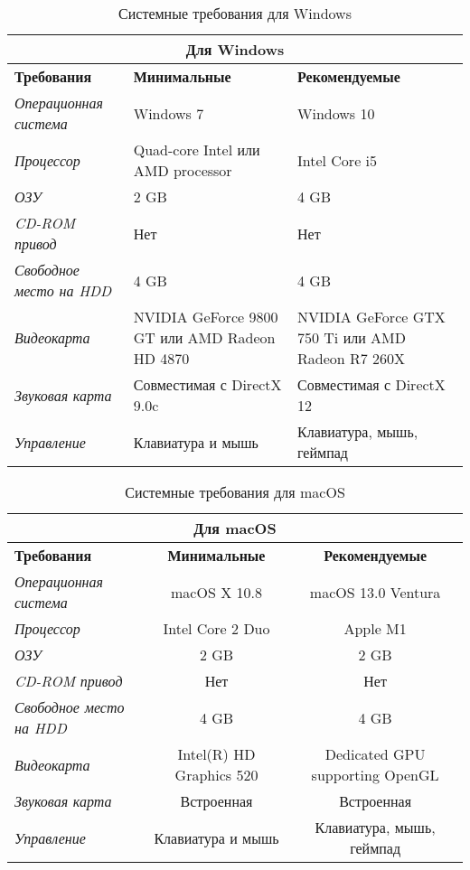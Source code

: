 \documentclass{article}
\begin{document}
	\begin{table}[h!]
		\centering
		\renewcommand{\arraystretch}{1.5}
		\setlength{\tabcolsep}{8pt}
		\begin{tabular}{|p{}|p{}|p{}|}
			\hline
			\multicolumn{3}{|c|}{\textbf{Для Windows}} \\ \hline
			\textbf{Требования} & \textbf{Минимальные} & \textbf{Рекомендуемые} \\ \hline
			\textit{Операционная система} & Windows 7 & Windows 10 \\ \hline
			\textit{Процессор} & Quad-core Intel \newline или AMD processor & Intel Core i5 \\ \hline
			\textit{ОЗУ} & 2 GB & 4 GB \\ \hline
			\textit{CD-ROM привод} & Нет & Нет \\ \hline
			\textit{Свободное место на HDD} & 4 GB & 4 GB \\ \hline
			\textit{Видеокарта} & NVIDIA GeForce 9800 GT \newline или AMD Radeon HD 4870 & NVIDIA GeForce GTX 750 Ti \newline или AMD Radeon R7 260X \\ \hline
			\textit{Звуковая карта} & Совместимая с DirectX 9.0c & Совместимая с DirectX 12 \\ \hline
			\textit{Управление} & Клавиатура и мышь & Клавиатура, мышь, геймпад \\ \hline
		\end{tabular}
		\caption{Системные требования для Windows}
		\label{tab:system-requirements1}
	\end{table}
	
	\begin{table}[h!]
		\centering
		\renewcommand{\arraystretch}{1.5}
		\setlength{\tabcolsep}{8pt}
		\begin{tabular}{|l|c|c|}
			\hline
			\multicolumn{3}{|c|}{\textbf{Для macOS}} \\ \hline
			\textbf{Требования} & \textbf{Минимальные} & \textbf{Рекомендуемые} \\ \hline
			\textit{Операционная система} & macOS X 10.8 & macOS 13.0 Ventura \\ \hline
			\textit{Процессор} &  Intel Core 2 Duo & Apple M1 \\ \hline
			\textit{ОЗУ} & 2 GB & 2 GB \\ \hline
			\textit{CD-ROM привод} & Нет & Нет \\ \hline
			\textit{Свободное место на HDD} & 4 GB & 4 GB \\ \hline
			\textit{Видеокарта} & Intel(R) HD Graphics 520 & Dedicated GPU supporting OpenGL \\ \hline
			\textit{Звуковая карта} & Встроенная & Встроенная \\ \hline
			\textit{Управление} & Клавиатура и мышь & Клавиатура, мышь, геймпад \\ \hline
		\end{tabular}
		\caption{Системные требования для macOS}
		\label{tab:system-requirements2}
	\end{table}
	
\end{document}
